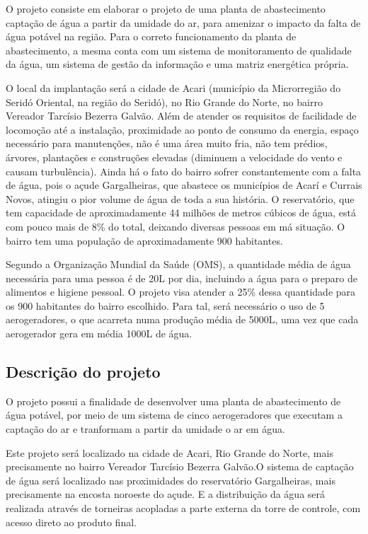   O projeto consiste em elaborar o projeto de uma planta de abastecimento captação de água a partir da umidade do ar, para amenizar
  o impacto da falta de água potável na região. Para o correto funcionamento da planta de abastecimento, a mesma conta com um sistema
  de monitoramento de qualidade da água, um sistema de gestão da informação e uma matriz energética própria.

  O local da implantação será a cidade de Acari (município da Microrregião do Seridó Oriental, na região do Seridó), no Rio Grande 
  do Norte, no bairro Vereador Tarcísio Bezerra Galvão. Além de atender os requisitos de facilidade de locomoção até a instalação,
  proximidade ao ponto de consumo da energia, espaço necessário para manutenções, não é uma área muito fria, não tem prédios, árvores,
  plantações e construções elevadas (diminuem a velocidade do vento e causam turbulência). Ainda há o fato do bairro sofrer 
  constantemente com a falta de água, pois o açude Gargalheiras, que abastece os municípios de Acarí e Currais Novos, atingiu o 
  pior volume de água de toda a sua história. O reservatório, que tem capacidade de aproximadamente 44 milhões de metros cúbicos
  de água, está com pouco mais de 8\% do total, deixando diversas pessoas em má situação. O bairro tem uma população de 
  aproximadamente 900 habitantes.

  Segundo a Organização Mundial da Saúde (OMS), a quantidade média de água necessária para uma pessoa é de 20L por dia, incluindo
  a água para o preparo de alimentos e higiene pessoal. O projeto visa atender a 25\% dessa quantidade para os 900 habitantes
  do bairro escolhido. Para tal, será necessário o uso de 5 aerogeradores, o que acarreta numa produção média de 5000L, uma vez
  que cada aerogerador gera em média 1000L de água.
  
\subsection{Descrição do projeto}
O projeto possui a finalidade de desenvolver uma planta de abastecimento de água potável, por meio de um sistema de cinco aerogeradores que executam a captação do ar e tranformam a partir da umidade o ar em água.

	 Este projeto será localizado na cidade de Acari, Rio Grande do Norte, mais precisamente no bairro Vereador Tarcísio Bezerra Galvão.O sistema de captação de água será localizado nas proximidades do reservatório Gargalheiras, mais precisamente na encosta noroeste do açude. E a distribuição da água será realizada através de torneiras acopladas a parte externa da torre de controle, com acesso direto ao produto final.

